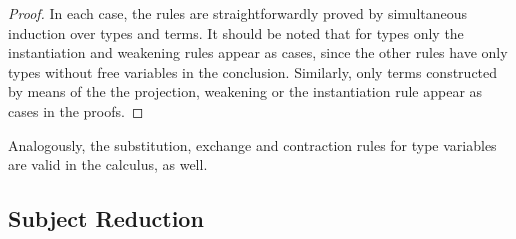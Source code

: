 \documentclass[preprint]{sigplanconf}
\begin{document}
\begin{proof}
  In each case, the rules are straightforwardly proved by simultaneous
  induction over types and terms.
  It should be noted that for types only the instantiation and weakening
  rules appear as cases, since the other rules have only types without
  free variables in the conclusion.
  Similarly, only terms constructed by means of the the projection, weakening
  or the instantiation rule appear as cases in the proofs.
\end{proof}

Analogously, the substitution, exchange and contraction rules for type variables
are valid in the calculus, as well.

\subsection{Subject Reduction}
\end{document}

